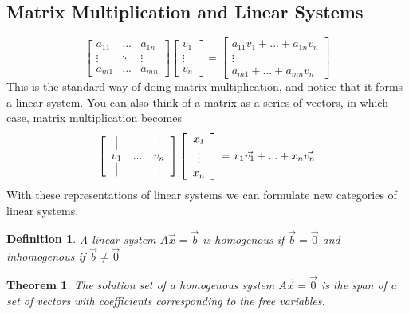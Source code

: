 \documentclass{article}
\newtheorem{theorem}{Theorem}
\newtheorem{definition}{Definition}
\begin{document}
        \subsection{Matrix Multiplication and Linear Systems}
        \[
        \left[
            \begin{array}{ccc}
                a_{11} & ... & a_{1n}\\
                \vdots & \ddots & \vdots\\
                a_{m1} & ... & a_{mn}
            \end{array}
        \right]
        \left[
            \begin{array}{c}
                v_1\\
                \vdots\\
                v_n
            \end{array}
        \right] = 
        \left[
            \begin{array}{c}
                a_{11}v_1 + ... + a_{1n}v_n\\
                \vdots\\
                a_{m1} + ... + a_{mn}v_n
            \end{array}
        \right]
        \]
        This is the standard way of doing matrix multiplication, and notice that it forms a linear system.
        You can also think of a matrix as a series of vectors, in which case, matrix multiplication becomes
        \[
        \left[
            \begin{array}{ccc}
                \vline &  & \vline\\
                v_1 & ... & v_n\\
                \vline &  & \vline
            \end{array}
        \right]
        \left[
            \begin{array}{c}
                x_1\\
                \vdots\\
                x_n
            \end{array}
        \right] = 
        x_1 \vec{v_1} +...+x_n \vec{v_n}
        \]
        With these representations of linear systems we can formulate new categories of linear systems.
        \begin{definition}
            A linear system $A\vec{x}=\vec{b}$ is homogenous if $\vec{b}=\vec{0}$ and inhomogenous if $\vec{b} \ne \vec{0}$
        \end{definition}
        \begin{theorem}
            The solution set of a homogenous system $A\vec{x}=\vec{0}$ is the span of a set of vectors with coefficients corresponding to the free variables.
        \end{theorem}
\end{document}
